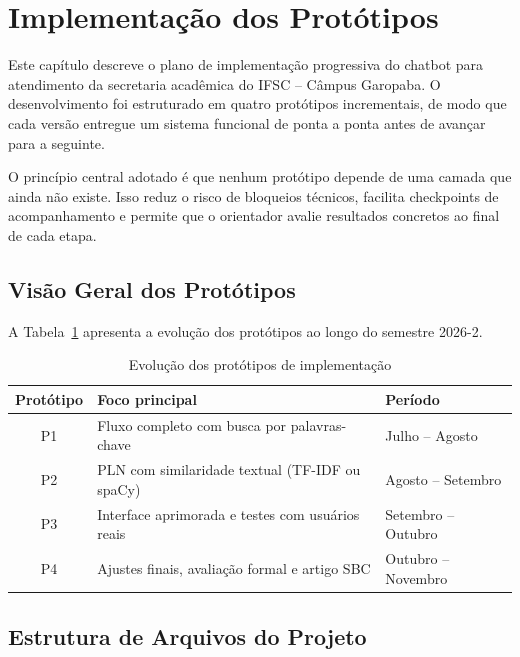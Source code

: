\section{Implementação dos Protótipos}

Este capítulo descreve o plano de implementação progressiva do chatbot para atendimento da secretaria acadêmica do IFSC -- Câmpus Garopaba. O desenvolvimento foi estruturado em quatro protótipos incrementais, de modo que cada versão entregue um sistema funcional de ponta a ponta antes de avançar para a seguinte.

O princípio central adotado é que nenhum protótipo depende de uma camada que ainda não existe. Isso reduz o risco de bloqueios técnicos, facilita checkpoints de acompanhamento e permite que o orientador avalie resultados concretos ao final de cada etapa.

\subsection{Visão Geral dos Protótipos}

A Tabela~\ref{tab:prototipos} apresenta a evolução dos protótipos ao longo do semestre 2026-2.

\begin{table}[htbp]
\centering
\caption{Evolução dos protótipos de implementação}
\label{tab:prototipos}
\begin{tabular}{|c|l|l|}
\hline
\textbf{Protótipo} & \textbf{Foco principal} & \textbf{Período} \\
\hline
P1 & Fluxo completo com busca por palavras-chave & Julho -- Agosto \\
P2 & PLN com similaridade textual (TF-IDF ou spaCy) & Agosto -- Setembro \\
P3 & Interface aprimorada e testes com usuários reais & Setembro -- Outubro \\
P4 & Ajustes finais, avaliação formal e artigo SBC & Outubro -- Novembro \\
\hline
\end{tabular}
\end{table}

\subsection{Estrutura de Arquivos do Projeto}

